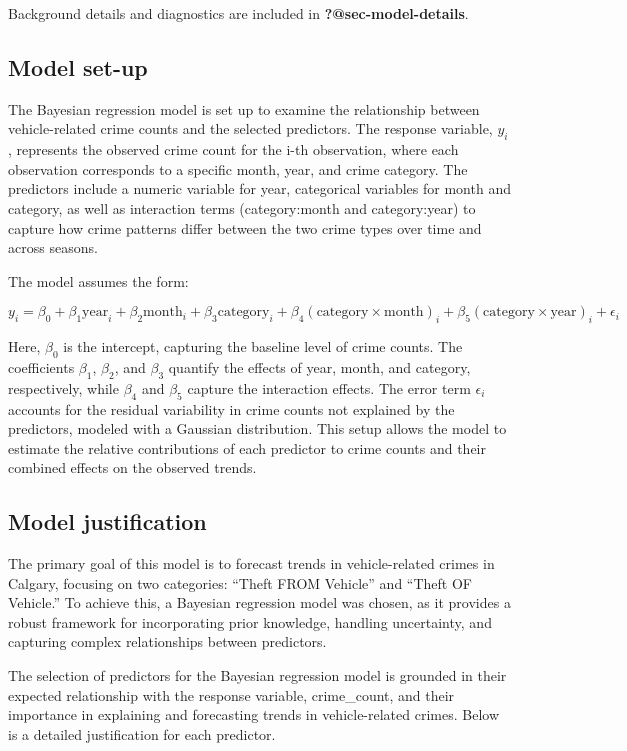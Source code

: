 \documentclass[
  letterpaper,
  DIV=11,
  numbers=noendperiod]{scrartcl}
\begin{document}
Background details and diagnostics are included in
\textbf{?@sec-model-details}.

\subsection{Model set-up}\label{model-set-up}

The Bayesian regression model is set up to examine the relationship
between vehicle-related crime counts and the selected predictors. The
response variable, \(y_i\), represents the observed crime count for the
i-th observation, where each observation corresponds to a specific
month, year, and crime category. The predictors include a numeric
variable for year, categorical variables for month and category, as well
as interaction terms (category:month and category:year) to capture how
crime patterns differ between the two crime types over time and across
seasons.

The model assumes the form:

\[
y_i = \beta_0 + \beta_1 \text{year}_i + \beta_2 \text{month}_i + \beta_3 \text{category}_i + \beta_4 (\text{category} \times \text{month})_i + \beta_5 (\text{category} \times \text{year})_i + \epsilon_i
\]

Here, \(\beta_0\) is the intercept, capturing the baseline level of
crime counts. The coefficients \(\beta_1\), \(\beta_2\), and \(\beta_3\)
quantify the effects of year, month, and category, respectively, while
\(\beta_4\) and \(\beta_5\) capture the interaction effects. The error
term \(\epsilon_i\) accounts for the residual variability in crime
counts not explained by the predictors, modeled with a Gaussian
distribution. This setup allows the model to estimate the relative
contributions of each predictor to crime counts and their combined
effects on the observed trends.

\subsection{Model justification}\label{model-justification}

The primary goal of this model is to forecast trends in vehicle-related
crimes in Calgary, focusing on two categories: ``Theft FROM Vehicle''
and ``Theft OF Vehicle.'' To achieve this, a Bayesian regression model
was chosen, as it provides a robust framework for incorporating prior
knowledge, handling uncertainty, and capturing complex relationships
between predictors.

The selection of predictors for the Bayesian regression model is
grounded in their expected relationship with the response variable,
crime\_count, and their importance in explaining and forecasting trends
in vehicle-related crimes. Below is a detailed justification for each
predictor.
\end{document}
